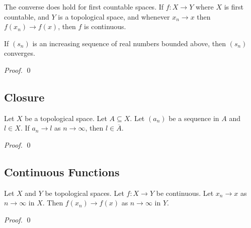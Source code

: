 \begin{prop}
The converse does hold for first countable spaces. If $f : X \rightarrow Y$ where $X$ is first countable, and $Y$ is a topological space, and whenever $x_n \rightarrow x$ then $f(x_n) \rightarrow f(x)$, then $f$ is continuous.
\end{prop}

\begin{prop}
If $(s_n)$ is an increasing sequence of real numbers bounded above, then $(s_n)$ converges.
\end{prop}

\begin{proof}
\pf
{}
\qed
\end{proof}

\subsection{Closure}

\begin{prop}
Let $X$ be a topological space. Let $A \subseteq X$. Let $(a_n)$ be a sequence in $A$ and $l \in X$. If $a_n \rightarrow l$ as $n \rightarrow \infty$, then $l \in \overline{A}$.
\end{prop}

\begin{proof}
\pf
{}
\qed
\end{proof}

\subsection{Continuous Functions}

\begin{prop}
Let $X$ and $Y$ be topological spaces. Let $f : X \rightarrow Y$ be continuous. Let $x_n \rightarrow x$ as $n \rightarrow \infty$ in $X$. Then $f(x_n) \rightarrow f(x)$ as $n \rightarrow \infty$ in $Y$.
\end{prop}

\begin{proof}
\pf
{}
\qed
\end{proof}

